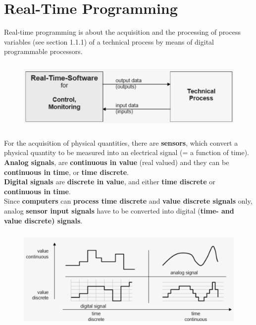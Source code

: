 \section{Real-Time Programming}

Real-time programming is about the acquisition and the processing of process variables (see section 1.1.1) of a technical process by means of digital programmable processors. 

    \begin{figure}[h]
    \centering
    \includegraphics[width=12cm, height=3.5cm]{Images/image135.png}
    \label{fig:Fig }
    \end{figure}
    
For the acquisition of physical quantities, there are \textbf{sensors}, which convert a physical quantity to be measured into an electrical signal (= a function of time).\\

\textbf{Analog signals}, are \textbf{continuous in value} (real valued) and they can be \textbf{continuous in time}, or \textbf{time discrete}. \\

\textbf{Digital signals} are \textbf{discrete in value}, and either \textbf{time discrete} or \textbf{continuous in time}.\\

Since \textbf{computers} can \textbf{process time discrete} and \textbf{value discrete signals} only, analog \textbf{sensor input signals} have to be converted into digital (\textbf{time- and value discrete) signals}.

    \begin{figure}[h]
    \centering
    \includegraphics[width=14cm, height=5cm]{Images/image136.png}
    \label{fig:Fig }
    \end{figure}

